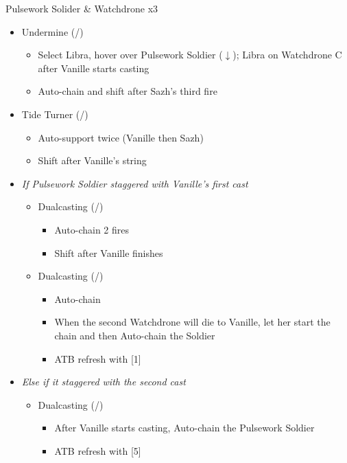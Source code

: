 \renewcommand{\first}{[1] Dualcasting (\rav/\rav)}
\renewcommand{\second}{[2] Tide Turner (\syn/\sab)}
\renewcommand{\third}{[3] Yin \& Yang (\rav/\med)}
\renewcommand{\fourth}{[4] Undermine (\rav/\sab)}
\renewcommand{\fifth}{[5] Dualcasting (\rav/\rav)}
\begin{battle}[0:40]{Pulsework Solider \& Watchdrone x3}
	\begin{itemize}
		\item \fourth
		      \begin{itemize}
			      \item Select Libra, hover over Pulsework Soldier ($\downarrow$); Libra on Watchdrone C after Vanille starts casting
			      \item Auto-chain and shift after Sazh's third fire
		      \end{itemize}
		\item \second
		      \begin{itemize}
			      \item Auto-support twice (Vanille then Sazh)
			      \item Shift after Vanille's string
		      \end{itemize}
		\item \textit{If Pulsework Soldier staggered with Vanille's first cast}
		      \begin{itemize}
			      \item \first
			            \begin{itemize}
				            \item Auto-chain 2 fires
				            \item Shift after Vanille finishes
			            \end{itemize}
			      \item \fifth
			            \begin{itemize}
				            \item Auto-chain
				            \item When the second Watchdrone will die to Vanille, let her start the chain and then Auto-chain the Soldier
				            \item ATB refresh with [1]
			            \end{itemize}
		      \end{itemize}
		\item \textit{Else if it staggered with the second cast}
		      \begin{itemize}
			      \item \first
			            \begin{itemize}
				            \item After Vanille starts casting, Auto-chain the Pulsework Soldier
				            \item ATB refresh with [5]
			            \end{itemize}
		      \end{itemize}
	\end{itemize}
	\itemdrop{6}{Aegisol}
\end{battle}
\renewcommand{\first}{[1] Tri-disaster (\rav/\rav/\rav)}
\renewcommand{\fourth}{[4] Variety (\rav/\sab/\med)}

